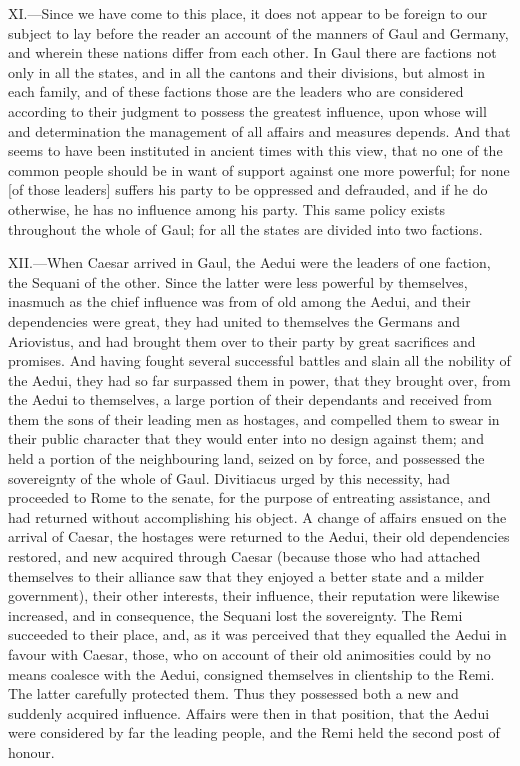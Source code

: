 XI.—Since we have come to this place, it does not appear to be foreign
to our subject to lay before the reader an account of the manners of
Gaul and Germany, and wherein these nations differ from each other. In
Gaul there are factions not only in all the states, and in all the
cantons and their divisions, but almost in each family, and of these
factions those are the leaders who are considered according to their
judgment to possess the greatest influence, upon whose will and
determination the management of all affairs and measures depends. And
that seems to have been instituted in ancient times with this view, that
no one of the common people should be in want of support against one
more powerful; for none [of those leaders] suffers his party to be
oppressed and defrauded, and if he do otherwise, he has no influence
among his party. This same policy exists throughout the whole of Gaul;
for all the states are divided into two factions.

XII.—When Caesar arrived in Gaul, the Aedui were the leaders of one
faction, the Sequani of the other. Since the latter were less powerful
by themselves, inasmuch as the chief influence was from of old among the
Aedui, and their dependencies were great, they had united to themselves
the Germans and Ariovistus, and had brought them over to their party by
great sacrifices and promises. And having fought several successful
battles and slain all the nobility of the Aedui, they had so far
surpassed them in power, that they brought over, from the Aedui to
themselves, a large portion of their dependants and received from them
the sons of their leading men as hostages, and compelled them to swear
in their public character that they would enter into no design against
them; and held a portion of the neighbouring land, seized on by force,
and possessed the sovereignty of the whole of Gaul. Divitiacus urged by
this necessity, had proceeded to Rome to the senate, for the purpose of
entreating assistance, and had returned without accomplishing his
object. A change of affairs ensued on the arrival of Caesar, the
hostages were returned to the Aedui, their old dependencies restored,
and new acquired through Caesar (because those who had attached
themselves to their alliance saw that they enjoyed a better state and a
milder government), their other interests, their influence, their
reputation were likewise increased, and in consequence, the Sequani lost
the sovereignty. The Remi succeeded to their place, and, as it was
perceived that they equalled the Aedui in favour with Caesar, those, who
on account of their old animosities could by no means coalesce with the
Aedui, consigned themselves in clientship to the Remi. The latter
carefully protected them. Thus they possessed both a new and suddenly
acquired influence. Affairs were then in that position, that the Aedui
were considered by far the leading people, and the Remi held the second
post of honour.

